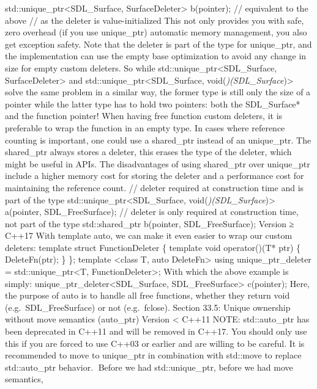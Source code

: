std::unique\_ptr\textless SDL\_Surface, SurfaceDeleter\textgreater{}
b(pointer); // equivalent to the above // as the deleter is
value-initialized This not only provides you with safe, zero overhead
(if you use unique\_ptr) automatic memory management, you also get
exception safety. Note that the deleter is part of the type for
unique\_ptr, and the implementation can use the empty base optimization
to avoid any change in size for empty custom deleters. So while
std::unique\_ptr\textless SDL\_Surface, SurfaceDeleter\textgreater{} and
std::unique\_ptr\textless SDL\_Surface,
void(\emph{)(SDL\_Surface})\textgreater{} solve the same problem in a
similar way, the former type is still only the size of a pointer while
the latter type has to hold two pointers: both the SDL\_Surface* and the
function pointer! When having free function custom deleters, it is
preferable to wrap the function in an empty type. In cases where
reference counting is important, one could use a shared\_ptr instead of
an unique\_ptr. The shared\_ptr always stores a deleter, this erases the
type of the deleter, which might be useful in APIs. The disadvantages of
using shared\_ptr over unique\_ptr include a higher memory cost for
storing the deleter and a performance cost for maintaining the reference
count. // deleter required at construction time and is part of the type
std::unique\_ptr\textless SDL\_Surface,
void(\emph{)(SDL\_Surface})\textgreater{} a(pointer, SDL\_FreeSurface);
// deleter is only required at construction time, not part of the type
std::shared\_ptr b(pointer, SDL\_FreeSurface); Version ≥ C++17 With
template auto, we can make it even easier to wrap our custom deleters:
template struct FunctionDeleter \{ template void operator()(T* ptr) \{
DeleteFn(ptr); \} \}; template \textless class T, auto
DeleteFn\textgreater{} using unique\_ptr\_deleter =
std::unique\_ptr\textless T, FunctionDeleter\textgreater; With which the
above example is simply: unique\_ptr\_deleter\textless SDL\_Surface,
SDL\_FreeSurface\textgreater{} c(pointer); Here, the purpose of auto is
to handle all free functions, whether they return void
(e.g.~SDL\_FreeSurface) or not (e.g.~fclose). Section 33.5: Unique
ownership without move semantics (auto\_ptr) Version \textless{} C++11
NOTE: std::auto\_ptr has been deprecated in C++11 and will be removed in
C++17. You should only use this if you are forced to use C++03 or
earlier and are willing to be careful. It is recommended to move to
unique\_ptr in combination with std::move to replace std::auto\_ptr
behavior. Before we had std::unique\_ptr, before we had move semantics,
